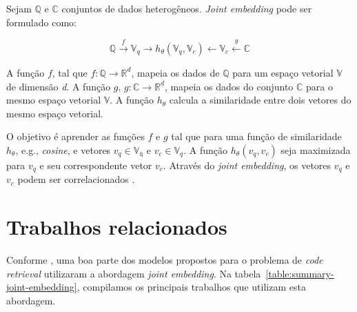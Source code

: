 Sejam $\mathbb{Q}$ e $\mathbb{C}$ conjuntos de dados heterogêneos. \textit{Joint embedding} pode ser formulado como:

\begin{equation}
        \mathbb{Q} \xrightarrow{f} \mathbb{V}_{q} \rightarrow h_{\theta}(\mathbb{V}_{q}, \mathbb{V}_{c}) \leftarrow \mathbb{V}_{c} \xleftarrow{g} \mathbb{C}
\end{equation}

A função $f$, tal que $f: \mathbb{Q} \rightarrow \mathbb{R}^{d}$, mapeia os dados de $\mathbb{Q}$ para um espaço vetorial $\mathbb{V}$ de dimensão \emph{d}. A função $g$, $g: \mathbb{C} \rightarrow \mathbb{R}^{d}$, mapeia os dados do conjunto $\mathbb{C}$ para o mesmo espaço vetorial $\mathbb{V}$. A função $h_{\theta}$ calcula a similaridade entre dois vetores do mesmo espaço vetorial.


O objetivo é aprender as funções $f$ e $g$ tal que para uma função de similaridade $h_{\theta}$, e.g., \textit{cosine}, e vetores $v_{q} \in \mathbb{V_q}$ e $v_{c} \in \mathbb{V}_q$. A função  $h_{\theta}(v_{q}, v_{c})$ seja maximizada para $v_{q}$ e seu correspondente vetor $v_{c}$.
Através do \textit{joint embedding}, os vetores $v_{q}$ e $v_{c}$ podem ser correlacionados \citep{Gu-deep-code-search:2018, cambronero-deep-learning-code-search:2019}.

    

\section{Trabalhos relacionados}\label{sec:code-retrieval-trabalhos-relacionados}

Conforme \cite{cambronero-deep-learning-code-search:2019}, uma boa parte dos modelos propostos para o problema de \textit{code retrieval} utilizaram a abordagem \textit{joint embedding}. Na tabela~\ref{table:summary-joint-embedding}, compilamos os principais trabalhos que utilizam esta abordagem. 

